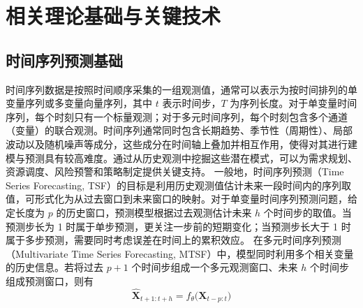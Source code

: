 \chapter{相关理论基础与关键技术} \section{时间序列预测基础} 时间序列数据是按照时间顺序采集的一组观测值，通常可以表示为按时间排列的单变量序列或多变量向量序列，其中 $t$ 表示时间步，$T$ 为序列长度。对于单变量时间序列，每个时刻只有一个标量观测；对于多元时间序列，每个时刻包含多个通道（变量）的联合观测。时间序列通常同时包含长期趋势、季节性（周期性）、局部波动以及随机噪声等成分，这些成分在时间轴上叠加并相互作用，使得对其进行建模与预测具有较高难度。通过从历史观测中挖掘这些潜在模式，可以为需求规划、资源调度、风险预警和策略制定提供关键支持。 一般地，时间序列预测（Time Series Forecasting, TSF）的目标是利用历史观测值估计未来一段时间内的序列取值，可形式化为从过去窗口到未来窗口的映射。对于单变量时间序列预测问题，给定长度为 $p$ 的历史窗口，预测模型根据过去观测估计未来 $h$ 个时间步的取值。当预测步长为 1 时属于单步预测，更关注一步前的短期变化；当预测步长大于 1 时属于多步预测，需要同时考虑误差在时间上的累积效应。 在多元时间序列预测（Multivariate Time Series Forecasting, MTSF）中，模型同时利用多个相关变量的历史信息。若将过去 $p+1$ 个时间步组成一个多元观测窗口、未来 $h$ 个时间步组成预测窗口，则有 \begin{equation} \hat{\mathbf{X}}_{t+1:t+h} = f_\theta\bigl(\mathbf{X}_{t-p:t}\bigr)
\label{eq:chap2-02}
\end{equation}
